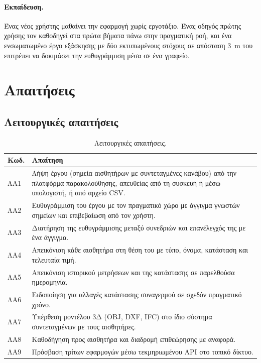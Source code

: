 \paragraph{Εκπαίδευση.} Ένας νέος χρήστης μαθαίνει την εφαρμογή χωρίς εργοτάξιο. Ένας οδηγός πρώτης χρήσης τον καθοδηγεί στα πρώτα βήματα πάνω στην πραγματική ροή, και ένα ενσωματωμένο έργο εξάσκησης με δύο εκτυπωμένους στόχους σε απόσταση \SI{3}{m} του επιτρέπει να δοκιμάσει την ευθυγράμμιση μέσα σε ένα γραφείο.

\section{Απαιτήσεις}
\label{sec:requirements}

\subsection{Λειτουργικές απαιτήσεις}

\begin{table}[htbp]
  \centering\small
  \caption{Λειτουργικές απαιτήσεις.}
  \label{tab:functional-req}
  \begin{tabularx}{\textwidth}{@{}lX@{}}
    \toprule
    Κωδ. & Απαίτηση \\
    \midrule
    ΛΑ1 & Λήψη έργου (σημεία αισθητήρων με συντεταγμένες κανάβου) από την πλατφόρμα παρακολούθησης, απευθείας από τη συσκευή ή μέσω υπολογιστή, ή από αρχείο CSV. \\
    ΛΑ2 & Ευθυγράμμιση του έργου με τον πραγματικό χώρο με άγγιγμα γνωστών σημείων και επιβεβαίωση από τον χρήστη. \\
    ΛΑ3 & Διατήρηση της ευθυγράμμισης μεταξύ συνεδριών και επανέλεγχός της με ένα άγγιγμα. \\
    ΛΑ4 & Απεικόνιση κάθε αισθητήρα στη θέση του με τύπο, όνομα, κατάσταση και τελευταία τιμή. \\
    ΛΑ5 & Απεικόνιση ιστορικού μετρήσεων και της κατάστασης σε παρελθούσα ημερομηνία. \\
    ΛΑ6 & Ειδοποίηση για αλλαγές κατάστασης συναγερμού σε σχεδόν πραγματικό χρόνο. \\
    ΛΑ7 & Υπέρθεση μοντέλου 3Δ (OBJ, DXF, IFC) στο ίδιο σύστημα συντεταγμένων με τους αισθητήρες. \\
    ΛΑ8 & Καθοδήγηση προς αισθητήρα και διαδρομή επιθεώρησης με αναφορά. \\
    ΛΑ9 & Πρόσβαση τρίτων εφαρμογών μέσω τεκμηριωμένου API στο τοπικό δίκτυο. \\
    \bottomrule
  \end{tabularx}
\end{table}

